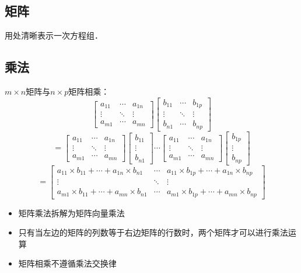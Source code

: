 \documentclass[12pt]{article}
\begin{document}
\begin{CJK}{UTF8}{gbsn}
\section{矩阵}
用处清晰表示一次方程组．
\subsection{乘法}
$m \times n$矩阵与$n \times p$矩阵相乘：
\begin{equation}
\left[
\begin{array}{ccc}
a_{11} & \cdots & a_{1n} \\
\vdots & \ddots & \vdots \\
a_{m1} & \cdots & a_{mn} 
\end{array}
\right]
\left[
\begin{array}{ccc}
b_{11} & \cdots & b_{1p} \\
\vdots & \ddots & \vdots \\
b_{n1} & \cdots & b_{np} 
\end{array}
\right]
\end{equation}
\begin{equation}
=
\left[
\begin{array}{ccc}
a_{11} & \cdots & a_{1n} \\
\vdots & \ddots & \vdots \\
a_{m1} & \cdots & a_{mn} 
\end{array}
\right]
\left[
\begin{array}{c}
b_{11} \\
\vdots \\
b_{n1}
\end{array}
\right]
\cdots
\left[
\begin{array}{ccc}
a_{11} & \cdots & a_{1n} \\
\vdots & \ddots & \vdots \\
a_{m1} & \cdots & a_{mn} 
\end{array}
\right]
\left[
\begin{array}{c}
b_{1p} \\
\vdots \\
b_{np}
\end{array}
\right]
\end{equation}
\begin{equation}
=\left[
\begin{array}{ccc}
a_{11}\times b_{11}+\cdots+a_{1n}\times b_{n1} & \cdots & a_{11}\times b_{1p}+\cdots+a_{1n}\times b_{np} \\
\vdots & \ddots & \vdots \\
a_{m1}\times b_{11}+\cdots+a_{mn}\times b_{n1} & \cdots & a_{m1}\times b_{1p}+\cdots+a_{mn}\times b_{np}
\end{array}
\right]
\end{equation}
\begin{itemize}
\item 矩阵乘法拆解为矩阵向量乘法
\item 只有当左边的矩阵的列数等于右边矩阵的行数时，两个矩阵才可以进行乘法运算
\item 矩阵相乘不遵循乘法交换律
\end{itemize}


\end{CJK}
\end{document}
